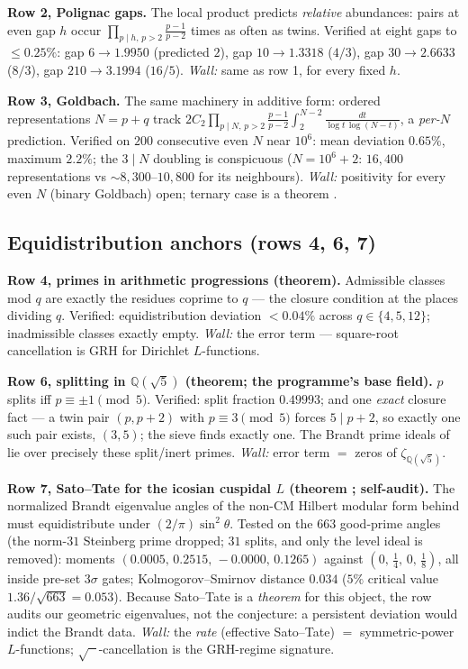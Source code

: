 \documentclass[11pt]{article}
\newcommand{\KK}{\mathbb{Q}(\sqrt5)}
\theoremstyle{remark}
\begin{document}
\textbf{Row 2, Polignac gaps.} The local product predicts \emph{relative}
abundances: pairs at even gap $h$ occur
$\prod_{p\mid h,\,p>2}\frac{p-1}{p-2}$ times as often as twins. Verified at
eight gaps to $\le0.25\%$: gap $6\to1.9950$ (predicted $2$), gap
$10\to1.3318$ ($4/3$), gap $30\to2.6633$ ($8/3$), gap $210\to3.1994$
($16/5$). \emph{Wall:} same as row 1, for every fixed $h$.

\textbf{Row 3, Goldbach.} The same machinery in additive form: ordered
representations $N=p+q$ track
$2C_2\prod_{p\mid N,\,p>2}\frac{p-1}{p-2}\int_2^{N-2}\frac{dt}{\log t\,\log(N-t)}$,
a \emph{per-$N$} prediction. Verified on $200$ consecutive even $N$ near
$10^6$: mean deviation $0.65\%$, maximum $2.2\%$; the $3\mid N$ doubling is
conspicuous ($N=10^6{+}2$: $16{,}400$ representations vs $\sim$$8{,}300$--$10{,}800$
for its neighbours). \emph{Wall:} positivity for every even $N$ (binary
Goldbach) open; ternary case is a theorem \cite{Helfgott}.

\subsection{Equidistribution anchors (rows 4, 6, 7)}

\textbf{Row 4, primes in arithmetic progressions (theorem).} Admissible
classes mod $q$ are exactly the residues coprime to $q$ --- the closure
condition at the places dividing $q$. Verified: equidistribution deviation
$<0.04\%$ across $q\in\{4,5,12\}$; inadmissible classes exactly empty.
\emph{Wall:} the error term --- square-root cancellation is GRH for Dirichlet
$L$-functions.

\textbf{Row 6, splitting in $\KK$ (theorem; the programme's base field).}
$p$ splits iff $p\equiv\pm1\pmod 5$. Verified: split fraction $0.49993$;
and one \emph{exact} closure fact --- a twin pair $(p,p+2)$ with
$p\equiv3\pmod5$ forces $5\mid p+2$, so exactly one such pair exists,
$(3,5)$; the sieve finds exactly one. The Brandt prime ideals of
\cite{Diffraction} lie over precisely these split/inert primes.
\emph{Wall:} error term $=$ zeros of $\zeta_{\KK}$.

\textbf{Row 7, Sato--Tate for the icosian cuspidal $L$ (theorem
\cite{BLGHT}; self-audit).} The normalized Brandt eigenvalue angles of the
non-CM Hilbert modular form behind \cite{Diffraction} must equidistribute
under $(2/\pi)\sin^2\theta$. Tested on the $663$ good-prime angles (the
norm-$31$ Steinberg prime dropped; $31$ splits, and only the level ideal is
removed): moments $(0.0005,\,0.2515,\,-0.0000,\,0.1265)$ against
$(0,\,\tfrac14,\,0,\,\tfrac18)$, all inside pre-set $3\sigma$ gates;
Kolmogorov--Smirnov distance $0.034$ ($5\%$ critical value
$1.36/\sqrt{663}=0.053$). Because Sato--Tate is a \emph{theorem} for this
object, the row audits our geometric eigenvalues, not the conjecture: a
persistent deviation would indict the Brandt data. \emph{Wall:} the
\emph{rate} (effective Sato--Tate) $=$ symmetric-power $L$-functions;
$\sqrt{\phantom{n}}$-cancellation is the GRH-regime signature.
\end{document}
